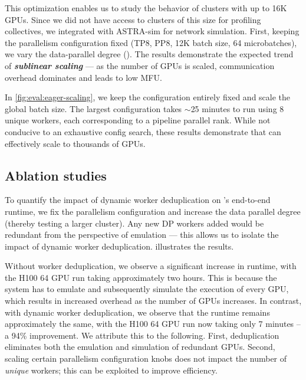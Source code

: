 This optimization enables us to study the behavior of clusters with up to 16K GPUs. Since we did not have access to clusters of this size for profiling collectives, we integrated with ASTRA-sim \cite{won2023astra} for network simulation. First, keeping the parallelism configuration fixed (TP8, PP8, 12K batch size, 64 microbatches), we vary the data-parallel degree (). The results demonstrate the expected trend of \textbf{\textit{sublinear scaling}} --- as the number of GPUs is scaled, communication overhead dominates and leads to low MFU.



In \cref{fig:eval:eager-scaling}, we keep the configuration entirely fixed and scale the global batch size. The largest configuration takes $\sim$25 minutes to run using 8 unique workers, each corresponding to a pipeline parallel rank. While not conducive to an exhaustive config search, these results demonstrate that \sysname can effectively scale to thousands of GPUs.

\subsection{Ablation studies}
\label{sec:eval:ablation}


 To quantify the impact of dynamic worker deduplication on \sysname's end-to-end runtime, we fix the parallelism configuration and increase the data parallel degree (thereby testing a larger cluster). Any new DP workers added would be redundant from the perspective of emulation --- this allows us to isolate the impact of dynamic worker deduplication.  illustrates the results.


Without worker deduplication, we observe a significant increase in runtime, with the H100 64 GPU run taking approximately two hours. This is because the system has to emulate and subsequently simulate the execution of every GPU, which results in increased overhead as the number of GPUs increases. In contrast, with dynamic worker deduplication, we observe that the runtime remains approximately the same, with the H100 64 GPU run now taking only 7 minutes -- a 94\% improvement. We attribute this to the following. First, deduplication eliminates both the emulation and simulation of redundant GPUs. Second, scaling certain parallelism configuration knobs does not impact the number of \textit{unique} workers; this can be exploited to improve efficiency.

